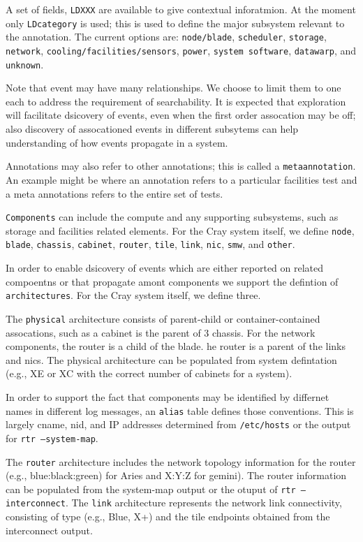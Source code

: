 A set of fields, \texttt{LDXXX} are available to give contextual inforatmion.
At the moment only \texttt{LDcategory} is used; this is used to define the major
subsystem relevant to the annotation. The current options are: \texttt{node/blade},
\texttt{scheduler}, \texttt{storage}, \texttt{network}, \texttt{cooling/facilities/sensors},
\texttt{power}, \texttt{system software}, \texttt{datawarp}, and \texttt{unknown}.

Note that event may have many relationships. We choose to limit them to one each to address
the requirement of searchability. It is expected that exploration will facilitate dsicovery
of events, even when the first order assocation may be off; also discovery of assocationed
events in different subsytems can help understanding of how events propagate in a system.

Annotations may also refer to other annotations; this is called a \texttt{metaannotation}.
An example might be where an annotation refers to a particular facilities
test and a meta annotations refers to the entire set of tests.

\texttt{Components} can include the compute and any supporting subsystems,
such as storage and facilities related elements. For the Cray system
itself, we define \texttt{node}, \texttt{blade}, \texttt{chassis},
\texttt{cabinet}, \texttt{router}, \texttt{tile}, \texttt{link}, \texttt{nic},
\texttt{smw}, and \texttt{other}.

In order to enable dsicovery of events which are either reported on related
compoentns or that propagate amont components we support the defintion
of \texttt{architectures}. For the Cray system itself, we define three.

The \texttt{physical} architecture consists of parent-child or
container-contained assocations, such as a cabinet is the parent of
3 chassis. For the network components, the router is a child of the blade.
he router is a parent of the links and nics. The physical architecture
can be populated from system defintation (e.g., XE or XC with the
correct number of cabinets for a system).

In order to support the fact that components may be identified by differnet
names in different log messages, an \texttt{alias} table defines those conventions.
This is largely cname, nid, and IP addresses determined from \texttt{/etc/hosts}
or the output for \texttt{rtr --system-map}.

The \texttt{router} architecture includes the network topology information
for the router (e.g., blue:black:green)
for Aries and X:Y:Z for gemini). The router information can be populated from
the system-map output or the otuput of \texttt{rtr --interconnect}.
The \texttt{link} architecture represents the network link connectivity,
consisting of type (e.g., Blue, X+) and the tile endpoints obtained
from the interconnect output.

